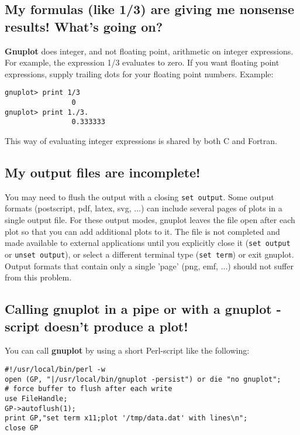 \documentclass[a4paper,11pt]{article}
\newcommand{\gnuplot}{\textbf{gnuplot }}
\newcommand{\Gnuplot}{\textbf{Gnuplot }}
\begin{document}
\subsection{My formulas (like 1/3) are giving me nonsense results! What's going on?}

\Gnuplot{} does integer, and not floating point, arithmetic on
integer expressions. For example, the expression 1/3 evaluates
to zero. If you want floating point expressions, supply
trailing dots for your floating point numbers. Example:


\small
\begin{verbatim}
gnuplot> print 1/3
                0
gnuplot> print 1./3.
                0.333333
\end{verbatim}
\normalsize

This way of evaluating integer expressions is shared by both C and Fortran.


\subsection{My output files are incomplete!}

You may need to flush the output with a closing \verb+set output+.
Some output formats (postscript, pdf, latex, svg, ...) can include several
pages of plots in a single output file.  For these output modes, gnuplot
leaves the file open after each plot so that you can add additional plots
to it.  The file is not completed and made available to external applications
until you explicitly close it (\verb+set output+ or \verb+unset output+),
or select a different terminal type (\verb+set term+) or exit gnuplot.
Output formats that contain only a single 'page' (png, emf, ...)
should not suffer from this problem.


\subsection{Calling \gnuplot in a pipe or with a \gnuplot-script
doesn't produce a plot!}

You can call \gnuplot by using a short Perl-script like the
following:
\small
\begin{verbatim}
#!/usr/local/bin/perl -w
open (GP, "|/usr/local/bin/gnuplot -persist") or die "no gnuplot";
# force buffer to flush after each write
use FileHandle;
GP->autoflush(1);
print GP,"set term x11;plot '/tmp/data.dat' with lines\n";
close GP
\end{verbatim}
\normalsize
\end{document}
